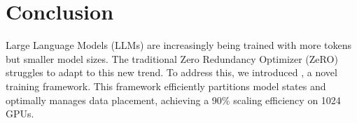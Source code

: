 \vspace{-10pt}
\section{Conclusion}

Large Language Models (LLMs) are increasingly being trained with more tokens but smaller model sizes. The traditional Zero Redundancy Optimizer (ZeRO) struggles to adapt to this new trend. To address this, we introduced \SysName, a novel training framework. This framework efficiently partitions model states and optimally manages data placement, achieving a 90\% scaling efficiency on 1024 GPUs.